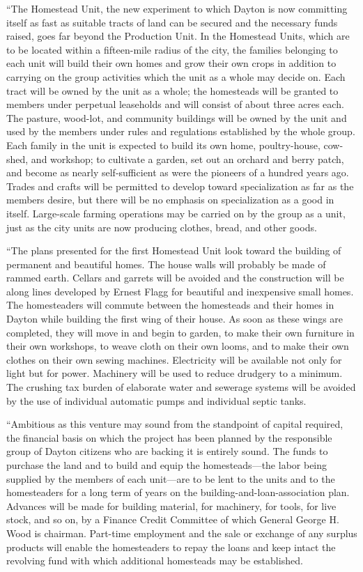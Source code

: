 \documentclass{book}
\begin{document}
“The Homestead Unit, the new experiment to which Dayton is now committing itself as fast as suitable tracts of land can be secured and the necessary funds raised, goes far beyond the Production Unit. In the Homestead Units, which are to be located within a fifteen-mile radius of the city, the families belonging to each unit will build their own homes and grow their own crops in addition to carrying on the group activities which the unit as a whole may decide on. Each tract will be owned by the unit as a whole; the homesteads will be granted to members under perpetual leaseholds and will consist of about three acres each. The pasture, wood-lot, and community buildings will be owned by the unit and used by the members under rules and regulations established by the whole group. Each family in the unit is expected to build its own home, poultry-house, cow-shed, and workshop; to cultivate a garden, set out an orchard and berry patch, and become as nearly self-sufficient as were the pioneers of a hundred years ago. Trades and crafts will be permitted to develop toward specialization as far as the members desire, but there will be no emphasis on specialization as a good in itself. Large-scale farming operations may be carried on by the group as a unit, just as the city units are now producing clothes, bread, and other goods.

“The plans presented for the first Homestead Unit look toward the building of permanent and beautiful homes. The house walls will probably be made of rammed earth. Cellars and garrets will be avoided and the construction will be along lines developed by Ernest Flagg for beautiful and inexpensive small homes. The homesteaders will commute between the homesteads and their homes in Dayton while building the first wing of their house. As soon as these wings are completed, they will move in and begin to garden, to make their own furniture in their own workshops, to weave cloth on their own looms, and to make their own clothes on their own sewing machines. Electricity will be available not only for light but for power. Machinery will be used to reduce drudgery to a minimum. The crushing tax burden of elaborate water and sewerage systems will be avoided by the use of individual automatic pumps and individual septic tanks.

“Ambitious as this venture may sound from the standpoint of capital required, the financial basis on which the project has been planned by the responsible group of Dayton citizens who are backing it is entirely sound. The funds to purchase the land and to build and equip the homesteads—the labor being supplied by the members of each unit—are to be lent to the units and to the homesteaders for a long term of years on the building-and-loan-association plan. Advances will be made for building material, for machinery, for tools, for live stock, and so on, by a Finance Credit Committee of which General George H. Wood is chairman. Part-time employment and the sale or exchange of any surplus products will enable the homesteaders to repay the loans and keep intact the revolving fund with which additional homesteads may be established.
\end{document}
